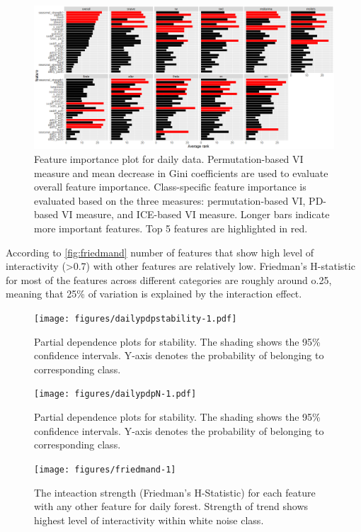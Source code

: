 \documentclass[11pt,a4paper,]{article}
\begin{document}
\begin{figure}[h]

{\centering \includegraphics{figures/vidaily-1} 

}

\caption{Feature importance plot for daily data. Permutation-based VI measure and mean decrease in Gini coefficients are used to evaluate overall feature importance. Class-specific feature importance is evaluated based on the three measures: permutation-based VI, PD-based VI measure, and ICE-based VI measure. Longer bars indicate more important features. Top 5 features are highlighted in red.}\label{fig:vidaily}
\end{figure}

According to \autoref{fig:friedmand} number of features that show high level of interactivity (\textgreater{}0.7) with other features are relatively low. Friedman's H-statistic for most of the features across different categories are roughly around o.25, meaning that 25\% of variation is explained by the interaction effect.

\begin{figure}
\centering
\texttt{[image: figures/dailypdpstability-1.pdf]}
\caption{\label{fig:dailypdpstability}Partial dependence plots for stability. The shading shows the 95\% confidence intervals. Y-axis denotes the probability of belonging to corresponding class.}
\end{figure}

\begin{figure}
\centering
\texttt{[image: figures/dailypdpN-1.pdf]}
\caption{\label{fig:dailypdpN}Partial dependence plots for stability. The shading shows the 95\% confidence intervals. Y-axis denotes the probability of belonging to corresponding class.}
\end{figure}

\begin{figure}[h]

{\centering \texttt{[image: figures/friedmand-1]} 

}

\caption{The inteaction strength (Friedman's H-Statistic) for each feature with any other feature for daily forest. Strength of trend shows highest level of interactivity within white noise class.}\label{fig:friedmand}
\end{figure}
\end{document}

